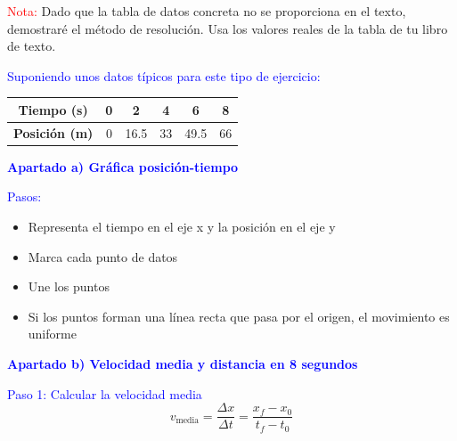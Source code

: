 \begin{exercise}
\begin{solu}
        \vspace{0.3cm}

        \textcolor{red}{Nota:} Dado que la tabla de datos concreta no se proporciona en el texto, demostraré el método de resolución. Usa los valores reales de la tabla de tu libro de texto.

        \textcolor{blue}{Suponiendo unos datos típicos para este tipo de ejercicio:}
        \begin{center}
            \begin{tabular}{@{}cccccc@{}}
                \toprule
                \textbf{Tiempo (s)} & \textbf{0} & \textbf{2} & \textbf{4} & \textbf{6} & \textbf{8} \\
                \midrule
                \textbf{Posición (m)} & 0 & 16.5 & 33 & 49.5 & 66 \\
                \bottomrule
            \end{tabular}
        \end{center}

        \textbf{\textcolor{blue}{Apartado a) Gráfica posición-tiempo}}

        \textcolor{blue}{Pasos:}
        \begin{itemize}
            \item Representa el tiempo en el eje x y la posición en el eje y
            \item Marca cada punto de datos
            \item Une los puntos
            \item Si los puntos forman una línea recta que pasa por el origen, el movimiento es uniforme
        \end{itemize}

        \textbf{\textcolor{blue}{Apartado b) Velocidad media y distancia en 8 segundos}}

        \textcolor{blue}{Paso 1: Calcular la velocidad media}
        \[
            \boxed{v_{\text{media}} = \frac{\Delta x}{\Delta t} = \frac{x_f - x_0}{t_f - t_0}}
        \]


\end{solu}
\end{exercise}
